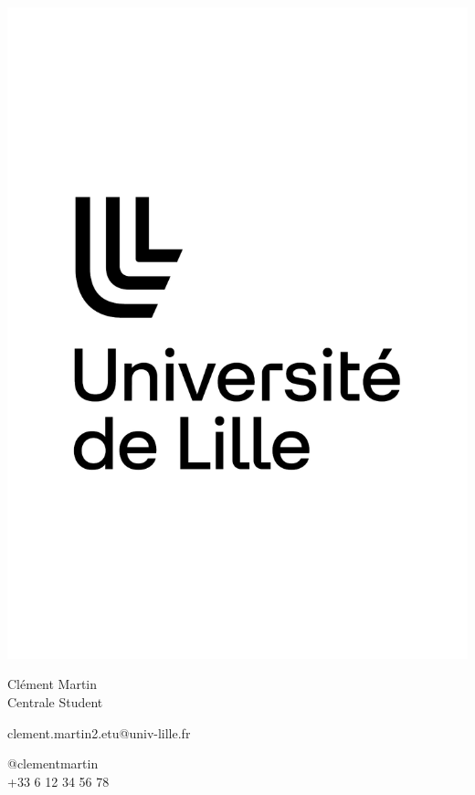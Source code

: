 \documentclass{article}
\begin{document}
\centering \includegraphics[width=.25\linewidth]{logo}\\[5pt]
\parbox{2in}{\Large \centering Clément Martin\\[1pt]
\normalsize Centrale Student}

\vfill
\raggedright
\begin{multicols}{2}
clement.martin2.etu@univ-lille.fr

\columnbreak
\raggedleft
@clementmartin\\
+33 6 12 34 56 78%
\end{multicols}%
\end{document}
